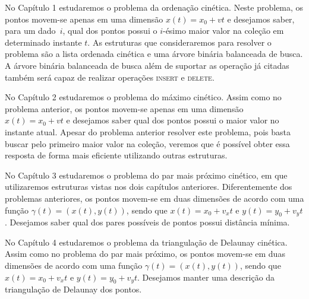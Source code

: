 No Capítulo 1 estudaremos o problema da ordenação cinética.
Neste problema, os pontos movem-se apenas em uma dimensão $x(t) = x_0 + vt$ e
desejamos saber, para um dado~$i$, qual dos pontos possui o $i$-ésimo maior valor na coleção em
determinado instante $t$.
As estruturas que consideraremos para resolver o problema são a lista
ordenada cinética e uma árvore binária balanceada de busca.
A árvore binária balanceada de busca além de suportar as operação já citadas
também será capaz de realizar operações \textsc{insert} e \textsc{delete}.

No Capítulo 2 estudaremos o problema do máximo cinético.
Assim como no problema anterior, os pontos movem-se apenas em uma
dimensão $x(t) = x_0 + vt$ e desejamos saber qual dos pontos possui o maior valor
no instante atual.
Apesar do problema anterior resolver este problema, pois basta buscar pelo primeiro
maior valor na coleção, veremos que é possível obter essa resposta de forma mais
eficiente utilizando outras estruturas.

No Capítulo 3 estudaremos o problema do par mais próximo cinético, em que
utilizaremos estruturas vistas nos dois capítulos anteriores.
Diferentemente dos problemas anteriores, os pontos movem-se em duas dimensões
de acordo com uma função $\gamma(t) = (x(t), y(t))$, sendo que $x(t) = x_0 + v_x t$ e
$y(t) = y_0 + v_y t$.
Desejamos saber qual dos pares possíveis de pontos possui distância mínima.

No Capítulo 4 estudaremos o problema da triangulação de Delaunay cinética.
Assim como no problema do par mais próximo, os pontos movem-se em duas dimensões de acordo com uma
função $\gamma(t) = (x(t), y(t))$, sendo que $x(t) = x_0 + v_x t$ e $y(t) = y_0 + v_y t$.
Desejamos manter uma descrição da triangulação de Delaunay dos pontos.
